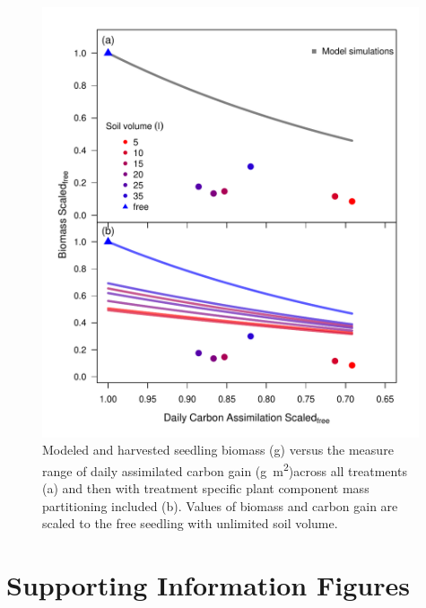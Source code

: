 \documentclass[a4paper]{article}\usepackage[]{graphicx}\usepackage[]{color}
\begin{document}
\begin{figure}[h!]
    \centering
    \includegraphics[width=0.99\textwidth]{gC_day.pdf}
    \caption{Modeled and harvested seedling biomass (g) versus the measure range of daily assimilated carbon gain (g~m\textsuperscript{2})across all treatments (a) and then with treatment specific plant component mass partitioning included (b).  Values of biomass and carbon gain are scaled to the free seedling with unlimited soil volume.}
    \label{fig:figure6}
\end{figure}

\clearpage
\section{Supporting Information Figures}

\renewcommand\thefigure{S\arabic{figure}}    
\setcounter{figure}{0}   
\end{document}
